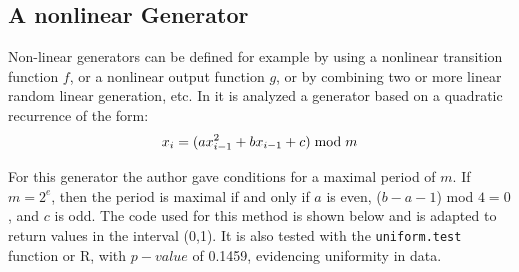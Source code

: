 \documentclass[10pt,leter,openany]{article}
\begin{document}
	\subsection{A nonlinear Generator}

		 Non-linear generators can be defined for example by using a nonlinear transition function $ f $, or a nonlinear output function $g$, or by combining two or more linear random linear generation, etc. In \citet{knuth2014art} it is analyzed a generator based on a quadratic recurrence of the form:
		 \begin{equation*}
		 	x_{i} = (ax_{i-1}^{2} + bx_{i-1} + c) \hspace{0.1cm}\text{mod} \hspace{0.1cm}  m
		 \end{equation*}
	 
		  
		  For this generator the author gave conditions for a maximal period of $m$. If  $m=2^{e}$, then the period is maximal if and only if $a$ is even, ($b-a-1$) mod $4 = 0$, and $c$ is odd. The code used for this method is shown below and  is adapted  to return values in the interval (0,1). It is also tested with the \texttt{uniform.test} function or R, with $p-value$ of 0.1459, evidencing uniformity in data.
 
		
		
	
	

 \clearpage

	
	
	
\end{document}
